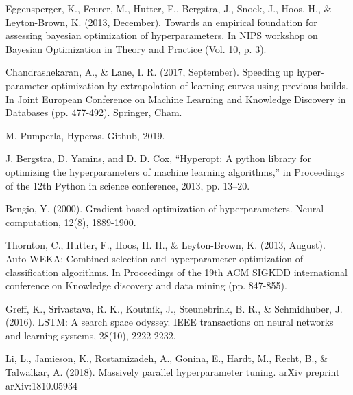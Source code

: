 \documentclass[conference]{IEEEtran}
\begin{document}
\begin{thebibliography}{}
Eggensperger, K., Feurer, M., Hutter, F., Bergstra, J., Snoek, J., Hoos, H., \& Leyton-Brown, K. (2013, December). Towards an empirical foundation for assessing bayesian optimization of hyperparameters. In NIPS workshop on Bayesian Optimization in Theory and Practice (Vol. 10, p. 3).

Chandrashekaran, A., \& Lane, I. R. (2017, September). Speeding up hyper-parameter optimization by extrapolation of learning curves using previous builds. In Joint European Conference on Machine Learning and Knowledge Discovery in Databases (pp. 477-492). Springer, Cham.

M. Pumperla, Hyperas. Github, 2019.

J. Bergstra, D. Yamins, and D. D. Cox, “Hyperopt: A python library for optimizing the hyperparameters of machine learning algorithms,” in Proceedings of the 12th Python in science conference, 2013, pp. 13–20.

Bengio, Y. (2000). Gradient-based optimization of hyperparameters. Neural computation, 12(8), 1889-1900.

Thornton, C., Hutter, F., Hoos, H. H., \& Leyton-Brown, K. (2013, August). Auto-WEKA: Combined selection and hyperparameter optimization of classification algorithms. In Proceedings of the 19th ACM SIGKDD international conference on Knowledge discovery and data mining (pp. 847-855).

Greff, K., Srivastava, R. K., Koutník, J., Steunebrink, B. R., \& Schmidhuber, J. (2016). LSTM: A search space odyssey. IEEE transactions on neural networks and learning systems, 28(10), 2222-2232.

Li, L., Jamieson, K., Rostamizadeh, A., Gonina, E., Hardt, M., Recht, B., \& Talwalkar, A. (2018). Massively parallel hyperparameter tuning. arXiv preprint arXiv:1810.05934
\end{thebibliography}
\end{document}
